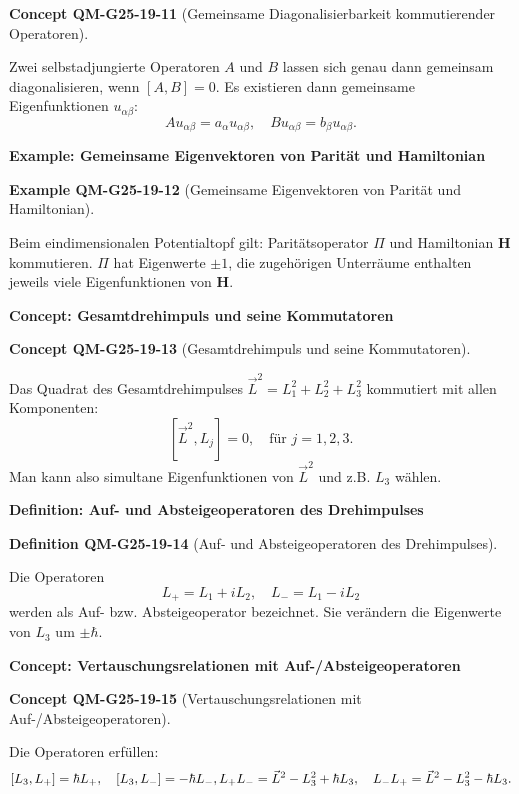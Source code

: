 \documentclass[10pt, letterpaper]{article}
\newcommand{\CustomHeading}[3]{%
  \par\medskip\noindent%
  \textbf{#1 #2} \textnormal{(#3)}.\enskip%
}
\newenvironment{DEF}[2]{\begin{unitbox}\CustomHeading{Definition}{#1}{#2}}{\end{unitbox}}
\newenvironment{EXA}[2]{\begin{unitbox}\CustomHeading{Example}{#1}{#2}}{\end{unitbox}}
\newenvironment{CONC}[2]{\begin{unitbox}\CustomHeading{Concept}{#1}{#2}}{\end{unitbox}}
\begin{document}
\begin{CONC}{QM-G25-19-11}{Gemeinsame Diagonalisierbarkeit kommutierender Operatoren}
Zwei selbstadjungierte Operatoren $A$ und $B$ lassen sich genau dann gemeinsam diagonalisieren, wenn $[A, B] = 0$. Es existieren dann gemeinsame Eigenfunktionen $u_{\alpha \beta}$:
$$
A u_{\alpha \beta} = a_\alpha u_{\alpha \beta}, \quad B u_{\alpha \beta} = b_\beta u_{\alpha \beta}.
$$
\end{CONC}



\textbf{Example: Gemeinsame Eigenvektoren von Parität und Hamiltonian}  


\begin{EXA}{QM-G25-19-12}{Gemeinsame Eigenvektoren von Parität und Hamiltonian}
Beim eindimensionalen Potentialtopf gilt: Paritätsoperator $\Pi$ und Hamiltonian $\mathbf{H}$ kommutieren. $\Pi$ hat Eigenwerte $\pm1$, die zugehörigen Unterräume enthalten jeweils viele Eigenfunktionen von $\mathbf{H}$.
\end{EXA}



\textbf{Concept: Gesamtdrehimpuls und seine Kommutatoren}  
\begin{CONC}{QM-G25-19-13}{Gesamtdrehimpuls und seine Kommutatoren}
Das Quadrat des Gesamtdrehimpulses $\vec{L}^2 = L_1^2 + L_2^2 + L_3^2$ kommutiert mit allen Komponenten:
$$
[\vec{L}^2, L_j] = 0, \quad \text{für } j = 1, 2, 3.
$$
Man kann also simultane Eigenfunktionen von $\vec{L}^2$ und z.B. $L_3$ wählen.
\end{CONC}


\textbf{Definition: Auf- und Absteigeoperatoren des Drehimpulses}  


\begin{DEF}{QM-G25-19-14}{Auf- und Absteigeoperatoren des Drehimpulses}
Die Operatoren
$$
L_+ = L_1 + i L_2, \quad L_- = L_1 - i L_2
$$
werden als Auf- bzw. Absteigeoperator bezeichnet. Sie verändern die Eigenwerte von \(L_3\) um \(\pm\hbar\).
\end{DEF}


\textbf{Concept: Vertauschungsrelationen mit Auf-/Absteigeoperatoren}


\begin{CONC}{QM-G25-19-15}{Vertauschungsrelationen mit Auf-/Absteigeoperatoren}
Die Operatoren erfüllen:
$$
[L_3, L_+] = \hbar L_+, \quad [L_3, L_-] = -\hbar L_-, \\
L_+ L_- = \vec{L}^2 - L_3^2 + \hbar L_3, \quad L_- L_+ = \vec{L}^2 - L_3^2 - \hbar L_3.
$$
\end{CONC}
\end{document}
